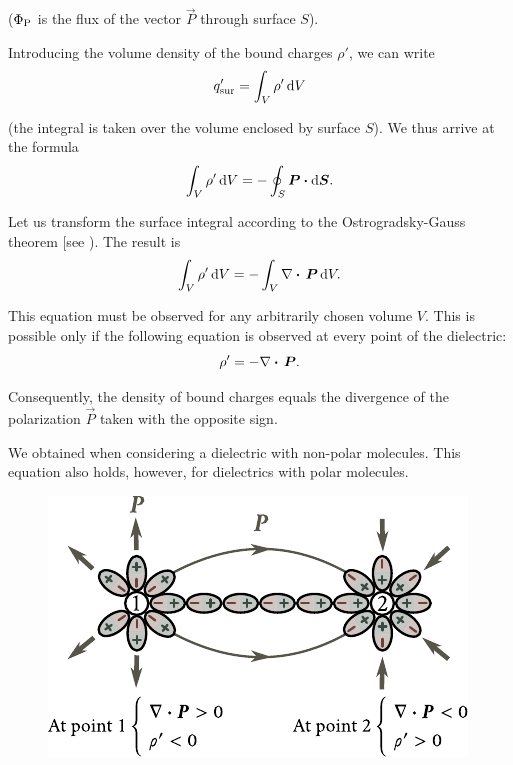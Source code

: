 \noindent
($\Phi_{\text{P}}$ is the flux of the vector $\vec{P}$ through surface $S$).

Introducing the volume density of the bound charges $\rho'$, we can write
\begin{equation*}
    q'_{\text{sur}} = \int_V \rho'\, \mathrm{d} V
\end{equation*}

\noindent
(the integral is taken over the volume enclosed by surface $S$). We thus arrive at the formula
\begin{equation*}
    \int_V \rho'\, \mathrm{d} V = - \oint_S \boldsymbol{P} \boldsymbol{\cdot} \mathrm{d}\boldsymbol{S}.
\end{equation*}

\noindent
Let us transform the surface integral according to the Ostrogradsky-Gauss theorem [see ). The result is
\begin{equation*}
    \int_V \rho'\, \mathrm{d} V = - \int_V \nabla\boldsymbol{\cdot}\,\boldsymbol{P}\, \mathrm{d} V.
\end{equation*}

\noindent
This equation must be observed for any arbitrarily chosen volume $V$. This is possible only if the following equation is observed at every point of the dielectric:
\begin{equation}\label{eq:2_12}
    \rho' = - \nabla\boldsymbol{\cdot}\,\boldsymbol{P}.
\end{equation}

\noindent
Consequently, the density of bound charges equals the divergence of the polarization $\vec{P}$ taken with the opposite sign.

We obtained  when considering a dielectric with non-polar molecules. This equation also holds, however, for dielectrics with polar molecules.

\begin{figure}[t]
	\begin{center}
		\includegraphics[scale=1]{figures/ch_02/fig_2_4.pdf}
		\caption[]{}
		\label{fig:2_4}
	\end{center}
	\vspace{-0.8cm}
\end{figure}

